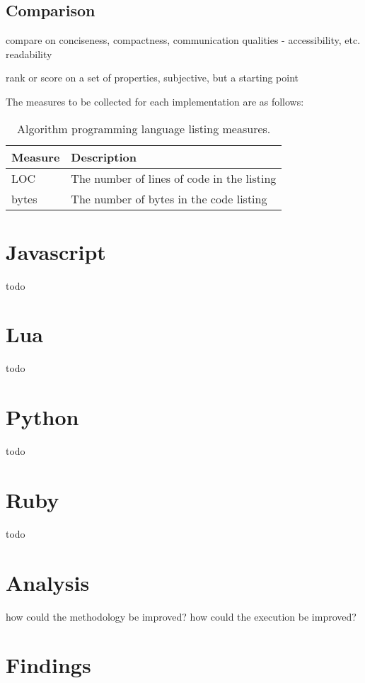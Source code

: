 \documentclass[a4paper, 11pt]{article}
\begin{document}
% 
% 
\subsection{Comparison}
compare on conciseness, compactness, communication qualities - accessibility, etc. readability

rank or score on a set of properties, subjective, but a starting point

The measures to be collected for each implementation are as follows:

\begin{table}[ht]
	\centering
		\begin{tabularx}{\textwidth}{lX}
		\toprule
		\textbf{Measure} & \textbf{Description} \\ 
		\toprule
		LOC & The number of lines of code in the listing \\
		bytes & The number of bytes in the code listing \\
		\bottomrule
		\end{tabularx}	
	\caption{Algorithm programming language listing measures.}
	\label{tab:measures}
\end{table}


% 
% 
\section{Javascript}
\label{sec:javascript}
todo


% 
% 
\section{Lua}
\label{sec:lua}
todo


% 
% 
\section{Python}
\label{sec:python}
todo


% 
% 
\section{Ruby}
\label{sec:ruby}
todo


% 
% 
\section{Analysis}
\label{sec:analysis}

how could the methodology be improved?
how could the execution be improved?


% 
% 
\section{Findings}
\label{sec:findings}






\end{document}
